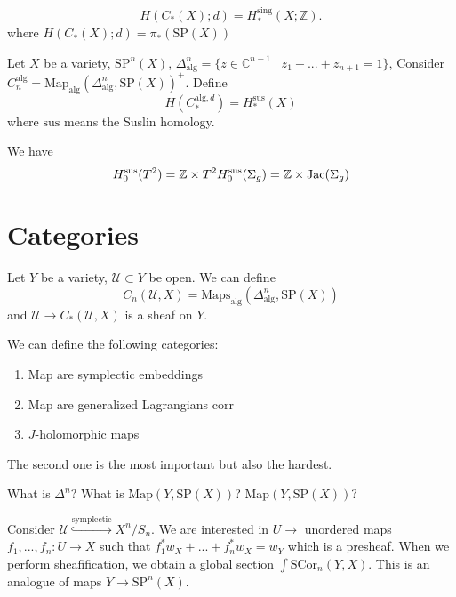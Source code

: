 \begin{theorem}

\[
H(C_*(X); d)= H_*^{\text{sing}}(X; \mathbb{Z}).
\]
where $H(C_*(X); d)=\pi_*(\text{SP}(X))$

\end{theorem}

\begin{theorem}

Let $X$ be a variety, $\text{SP}^n(X)$, $\Delta_{\text{alg}}^n=\{ z\in \mathbb{C}^{n-1} \mid z_1+...+z_{n+1} =1\}$, Consider $C_n^{\text{alg}}=\text{Map}_{\text{alg}}(\Delta_{\text{alg}}^n, \text{SP}(X))^+$. Define
\[
H(C_*^{\text{alg}, d} )=H_*^{\text{sus}}(X)
\]
where $\text{sus}$ means the Suslin homology.

We have
\[
H_0^{\text{sus}}(T^2) = \mathbb{Z}\times T^2 \\
H_0^{\text{sus}}(\Sigma_g)=\mathbb{Z}\times \text{Jac}(\Sigma_g)
\]

\end{theorem}

\section{Categories}

Let $Y$ be a variety, $\mathcal{U}\subset Y$ be open. We can define
\[
C_n(\mathcal{U}, X)=\text{Maps}_{\text{alg}} (\Delta_{\text{alg}}^n, \text{SP}(X))
\]
and $\mathcal{U}\to C_*(\mathcal{U}, X)$ is a sheaf on $Y$.

We can define the following categories:
\begin{enumerate}
\item Map are symplectic embeddings
\item Map are generalized Lagrangians corr
\item $J$-holomorphic maps
\end{enumerate}

The second one is the most important but also the hardest.

\begin{problem}
    What is $\Delta^n$? What is $\text{Map}(Y, \text{SP}(X))$? $\text{Map}(Y, \text{SP}(X))$?
\end{problem}

Consider $\mathcal{U} \stackrel{\text{symplectic}}{\hookrightarrow} X^n/S_n$. We are interested in $U\longrightarrow$ unordered maps $f_1,...,f_n: U\to X$ such that $f_1^* w_X + ... +f_n^* w_X= w_Y$ which is a presheaf. When we perform sheafification, we obtain a global section $\int \text{SCor}_n(Y,X)$. This is an analogue of maps $Y\to \text{SP}^n(X)$.

